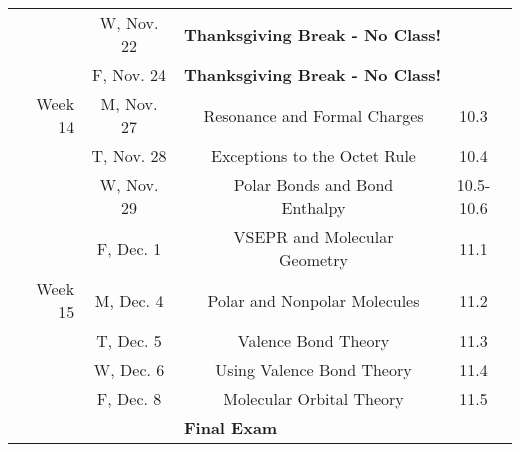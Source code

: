 \begin{tabular}{rcccc}
& W, Nov. 22& \multicolumn{3}{l}{\textbf{Thanksgiving Break - No Class!}}\\
& F, Nov. 24& \multicolumn{3}{l}{\textbf{Thanksgiving Break - No Class!}}\\
\midrule
Week 14 & M, Nov. 27&& Resonance and Formal Charges & 10.3\\
& T, Nov. 28&& Exceptions to the Octet Rule & 10.4\\
& W, Nov. 29&& Polar Bonds and Bond Enthalpy & 10.5-10.6\\
& F, Dec. 1&& VSEPR and Molecular Geometry & 11.1\\
\midrule
Week 15 & M, Dec. 4&& Polar and Nonpolar Molecules & 11.2\\
& T, Dec. 5&& Valence Bond Theory & 11.3\\
& W, Dec. 6&& Using Valence Bond Theory & 11.4\\
& F, Dec. 8&& Molecular Orbital Theory & 11.5\\
\midrule
\midrule
& & \multicolumn{3}{l}{\textbf{Final Exam}}\\
\end{tabular}